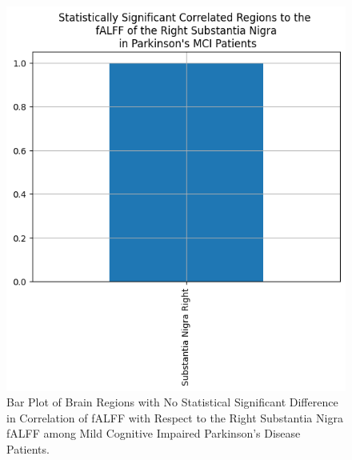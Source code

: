 \documentclass[12pt]{article}
\begin{document}
\begin{figure}[h]  %
    \centering
    \includegraphics[width=\textwidth]{"../img/statistically_significant_correlated_regions_sn_mci.png"}  %
    \caption{Bar Plot of Brain Regions with No Statistical Significant Difference in Correlation of fALFF with Respect to the Right Substantia Nigra fALFF among Mild Cognitive Impaired Parkinson's Disease Patients.}
    \label{fig:mci}  %
\end{figure}

\FloatBarrier
\end{document}
